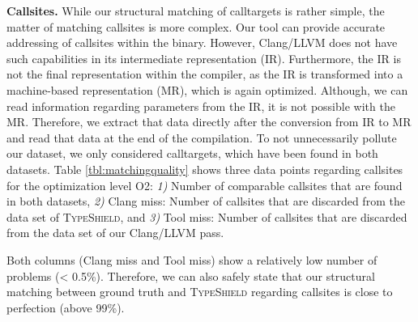 \textbf{Callsites.} While our structural matching of calltargets is rather simple, the matter of matching callsites is more complex. Our tool can provide accurate addressing of 
callsites within the binary. However, Clang/LLVM does not have such capabilities in its intermediate representation (IR). Furthermore, the IR is not the final representation within
the compiler, as the IR is transformed into a machine-based representation (MR), which is again optimized. Although, we can read information regarding parameters from the IR, it 
is not possible with the MR. Therefore, we extract that data directly after the conversion from IR to MR and read that data at the end of the compilation. To not unnecessarily 
pollute our dataset, we only considered calltargets, which have been found in both datasets. Table \ref{tbl:matchingquality} shows three data points regarding callsites for 
the optimization level O2:
\textit{1)} Number of comparable callsites that are found in both datasets,
\textit{2)} Clang miss: Number of callsites that are discarded from the data set of \textsc{TypeShield}, and
\textit{3)} Tool miss: Number of callsites that are discarded from the data set of our Clang/LLVM pass.

Both columns (Clang miss and Tool miss) show a relatively low number of problems (< 0.5\%). Therefore, we can also 
safely state that our structural matching between ground truth and \textsc{TypeShield} regarding callsites is close to perfection (above 99\%).

